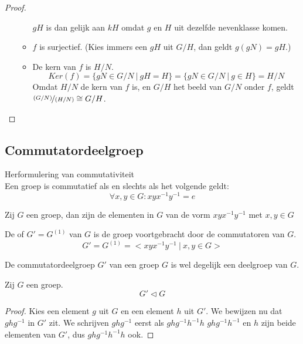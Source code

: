 \documentclass[main.tex]{subfiles}
\begin{document}
\begin{st}
\begin{proof}
\begin{itemize}
\begin{itemize}
        $gH$ is dan gelijk aan $kH$ omdat $g$ en $H$ uit dezelfde nevenklasse komen.
      \item $f$ is surjectief.
        (Kies immers een $gH$ uit $G/H$, dan geldt $g(gN)=gH$.)
      \item De kern van $f$ is $H/N$.
        \[ Ker(f) = \{ gN \in G/N \ |\ gH = H \} = \{ gN \in G/N \ |\ g
        \in H \} = H/N \] Omdat $H/N$ de kern van $f$ is, en $G/H$ het
        beeld van $G/N$ onder $f$, geldt $\nicefrac{(G/N)}{(H/N)} \cong G/H$.
      \end{itemize}
    \end{itemize}
  \end{proof}
\end{st}

\subsection{Commutatordeelgroep}
\label{sec:commutatordeelgroep}

\begin{st}
  \label{st:herformulering-commutativiteit}
  Herformulering van commutativiteit\\
  Een groep is commutatief als en slechts als het volgende geldt:
  \[ \forall x,y \in G: xyx^{-1}y^{-1} = e \]
\end{st}

\begin{de}
  Zij $G$ een groep, dan zijn de elementen in $G$ van de vorm $xyx^{-1}y^{-1}$ met $x,y\in G$ 
\end{de}

\begin{de}
  De  of  $G' = G^{(1)}$ van $G$ is de groep voortgebracht door de commutatoren van $G$.
  \[ G' = G^{(1)} = < xyx^{-1}y^{-1} \ |\ x,y\in G > \]
\end{de}

\begin{st}
  \label{st:commutatordeelgroep-is-deelgroep}
  De commutatordeelgroep $G'$ van een groep $G$ is wel degelijk een deelgroep van $G$.
\end{st}

\begin{st}
  \label{st:commutatordeelgroep-is-normaaldeler}
  Zij $G$ een groep.
  \[ G' \triangleleft G \]

  \begin{proof}
    Kies een element $g$ uit $G$ en een element $h$ uit $G'$.
    We bewijzen nu dat $ghg^{-1}$ in $G'$ zit.
    We schrijven $ghg^{-1}$ eerst als $ghg^{-1}h^{-1}h$
    $ghg^{-1}h^{-1}$ en $h$ zijn beide elementen van $G'$, dus $ghg^{-1}h^{-1}h$ ook.
  \end{proof}
\end{st}
\end{document}
